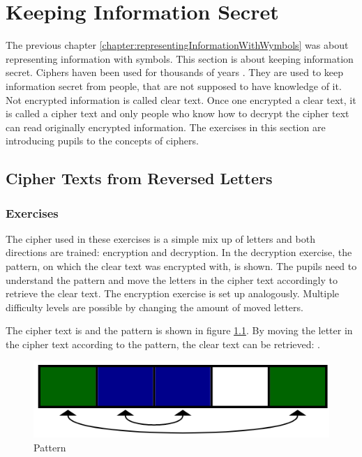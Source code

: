 \chapter{Keeping Information Secret}
\label{chapter:keepingInformationSecret}

The previous chapter \ref{chapter:representingInformationWithWymbols} was about representing information with symbols. This section is about keeping information secret.
Ciphers haven been used for thousands of years \cite{HistoryOfCryptography}. They are used to keep information secret from people, that are not supposed to have knowledge of it. Not encrypted information is called clear text. Once one encrypted a clear text, it is called a cipher text and only people who know how to decrypt the cipher text can read originally encrypted information.
The exercises in this section are introducing pupils to the concepts of ciphers.

\section{Cipher Texts from Reversed Letters}
\label{section:patterns}

\subsection{Exercises}
The cipher used in these exercises is a simple mix up of letters and both directions are trained: encryption and decryption. In the decryption exercise, the pattern, on which the clear text was encrypted with, is shown. The pupils need to understand the pattern and move the letters in the cipher text accordingly to retrieve the clear text. The encryption exercise is set up analogously. Multiple difficulty levels are possible by changing the amount of moved letters.

\begin{example}
    The cipher text is  and the pattern is shown in figure \ref{fig:pattern}. By moving the letter in the cipher text according to the pattern, the clear text can be retrieved: .
\end{example}

\begin{figure} 
    \centering
    \includegraphics[width=0.4 \columnwidth]{figures/pattern.png}
    \caption{Pattern} 
    \label{fig:pattern} 
\end{figure}

